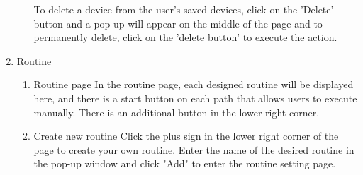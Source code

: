 \begin{enumerate}[label=\arabic*.]
\begin{enumerate}[label*={\arabic*.},ref=\theenumi.\arabic*]
              To delete a device from the user's saved devices, click on the 'Delete' button and a pop up
                    will appear on the middle of the page and to permanently delete, click on the 'delete button' to execute the action. \\
          \end{enumerate}
    \newpage
    \item {\large{Routine}}\\
      \begin{enumerate}[label*={\arabic*.},ref=\theenumi.\arabic*]
        \item Routine page
          In the routine page, each designed routine will be displayed here, and there is a start button on each path that allows users to execute manually. There is an additional button in the lower right corner.\\
              \newpage
              \item Create new routine
                    Click the plus sign in the lower right corner of the page to create your own routine. Enter the name of the desired routine in the pop-up window and click "Add" to enter the routine setting page.\\


\end{enumerate}
\end{enumerate}
